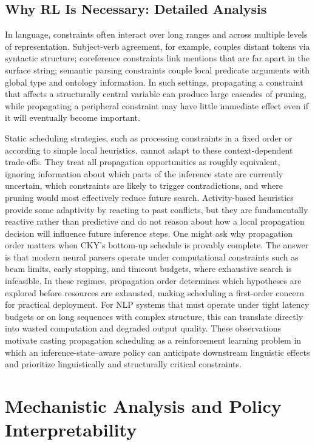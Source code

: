 \documentclass[11pt]{article}
\begin{document}
\subsection{Why RL Is Necessary: Detailed Analysis}
\label{app:why-rl}
In language, constraints often interact over long ranges and across multiple levels of representation. Subject-verb agreement, for example, couples distant tokens via syntactic structure; coreference constraints link mentions that are far apart in the surface string; semantic parsing constraints couple local predicate arguments with global type and ontology information. In such settings, propagating a constraint that affects a structurally central variable can produce large cascades of pruning, while propagating a peripheral constraint may have little immediate effect even if it will eventually become important.

Static scheduling strategies, such as processing constraints in a fixed order or according to simple local heuristics, cannot adapt to these context-dependent trade-offs. They treat all propagation opportunities as roughly equivalent, ignoring information about which parts of the inference state are currently uncertain, which constraints are likely to trigger contradictions, and where pruning would most effectively reduce future search. Activity-based heuristics provide some adaptivity by reacting to past conflicts, but they are fundamentally reactive rather than predictive and do not reason about how a local propagation decision will influence future inference steps. One might ask why propagation order matters when CKY's bottom-up schedule is provably complete. The answer is that modern neural parsers operate under computational constraints such as beam limits, early stopping, and timeout budgets, where exhaustive search is infeasible. In these regimes, propagation order determines which hypotheses are explored before resources are exhausted, making scheduling a first-order concern for practical deployment. For NLP systems that must operate under tight latency budgets or on long sequences with complex structure, this can translate directly into wasted computation and degraded output quality. These observations motivate casting propagation scheduling as a reinforcement learning problem in which an inference-state--aware policy can anticipate downstream linguistic effects and prioritize linguistically and structurally critical constraints.



\section{Mechanistic Analysis and Policy Interpretability}
\label{app:mechanistic}
\end{document}
